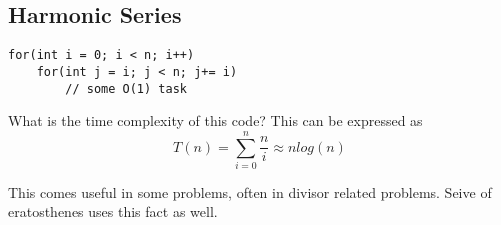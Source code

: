 
\subsection*{Harmonic Series}
\begin{lstlisting}
for(int i = 0; i < n; i++)
	for(int j = i; j < n; j+= i)
		// some O(1) task
\end{lstlisting}

What is the time complexity of this code? This can be expressed as
\begin{equation}
T(n) = \sum_{i = 0}^{n} \frac{n}{i}  \approx nlog(n)
\end{equation}

This comes useful in some problems, often in divisor related problems. Seive of eratosthenes uses this fact as well.
